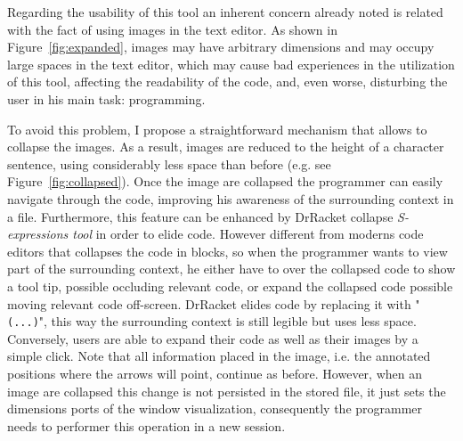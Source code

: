 \begin{figure}[h]
\begin{minipage}[t]{.495\textwidth}
  \label{fig:ortocone2}
\end{minipage}
\end{figure}

Regarding the usability of this tool an inherent concern already noted is related with the fact of using images in the text editor. As shown in Figure~\ref{fig:expanded}, images may have arbitrary dimensions and may occupy large spaces in the text editor, which may cause bad experiences in the utilization of this tool, affecting the readability of the code, and, even worse, disturbing the user in his main task: programming.

To avoid this problem, I propose a straightforward mechanism that allows to collapse the images. As a result, images are reduced to the height of a character sentence, using considerably less space than before (e.g. see Figure~\ref{fig:collapsed}). Once the image are collapsed the programmer can easily navigate through the code, improving his awareness of the surrounding context in a file. Furthermore, this feature can be enhanced by DrRacket collapse \textit{S-expressions tool} in order to elide code. However different from moderns code editors that collapses the code in blocks, so when the programmer wants to view part of the surrounding context, he either have to over the collapsed code to show a tool tip, possible occluding relevant code, or expand the collapsed code possible moving relevant code off-screen. DrRacket elides code by replacing it with "\texttt{(...)}", this way the surrounding context is still legible but uses less space. Conversely, users are able to expand their code as well as their images by a simple click. Note that all information placed in the image, i.e. the annotated positions where the arrows will point, continue as before. However, when an image are collapsed this change is not persisted in the stored file, it just sets the dimensions ports of the window visualization, consequently the programmer needs to performer this operation in a new session. 

